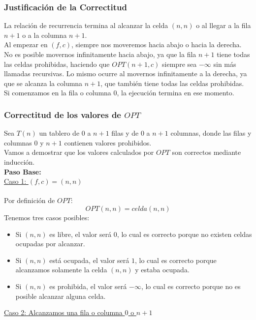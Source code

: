 \subsubsection{Justificación de la Correctitud}

La relación de recurrencia termina al alcanzar la celda $(n,n)$ o al llegar a la fila $n+1$ o a la columna $n+1$. \\
Al empezar en \( (f,c) \), siempre nos moveremos hacia abajo o hacia la derecha. No es posible movernos infinitamente hacia abajo, ya que la fila $n+1$ tiene todas las celdas prohibidas, haciendo que \( OPT(n+1,c) \) siempre sea $-\infty$ sin más llamadas recursivas. Lo mismo ocurre al movernos infinitamente a la derecha, ya que se alcanza la columna $n+1$, que también tiene todas las celdas prohibidas.\\
Si comenzamos en la fila o columna $0$, la ejecución termina en ese momento.\\

\subsubsection{Correctitud de los valores de $OPT$}

Sea $T(n)$ un tablero de $0$ a $n+1$ filas y de $0$ a $n+1$ columnas,
donde las filas y columnas $0$ y $n+1$ contienen valores prohibidos. \\

Vamos a demostrar que los valores calculados por $OPT$ son correctos mediante inducción.\\

\textbf{Paso Base:} \\

\underline{Caso 1: $(f,c) = (n,n)$} \\\\
Por definición de $OPT$:
\[
	OPT(n,n) = celda(n,n)
\]
Tenemos tres casos posibles:
\begin{itemize}
	\item Si $(n,n)$ es libre, el valor será $0$, lo cual es correcto porque no existen celdas ocupadas por alcanzar.
	\item Si $(n,n)$ está ocupada, el valor será \( 1 \), lo cual es correcto porque alcanzamos solamente la celda $(n,n)$ y estaba ocupada.
	\item Si $(n,n)$ es prohibida, el valor será $-\infty$, lo cual es correcto porque no es posible alcanzar alguna celda.
\end{itemize}
\underline{Caso 2: Alcanzamos una fila o columna $0$ o $n+1$} \\


